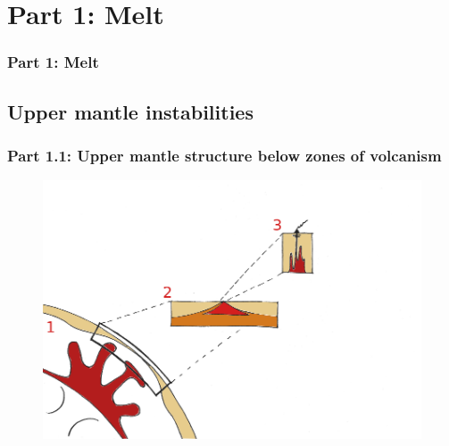 \documentclass[aspectratio=169]{beamer}
\begin{document}
\section{Part 1: Melt}

{
\begin{frame}
    \frametitle{Part 1: Melt}
\end{frame}
}

\subsection{Upper mantle instabilities}

\begin{frame}
    \frametitle{Part 1.1: Upper mantle structure below zones of volcanism}
    \begin{figure}
        \includegraphics[height=0.9\paperheight]{./pictures/drawing.png}
    \end{figure}
\end{frame}
\end{document}
